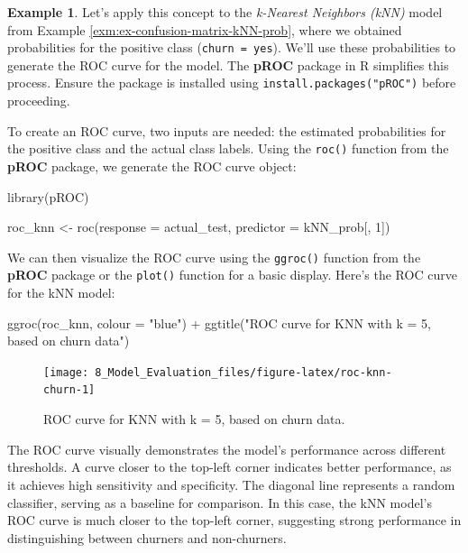 \documentclass[
  11pt,
]{book}
\makeatletter
\newenvironment{Shaded}{}{}
\newcommand{\AttributeTok}[1]{#1}
\newcommand{\DecValTok}[1]{#1}
\newcommand{\FunctionTok}[1]{#1}
\newcommand{\NormalTok}[1]{#1}
\newcommand{\OtherTok}[1]{\textcolor[rgb]{0.39,0.39,0.39}{#1}}
\newcommand{\SpecialCharTok}[1]{\textcolor[rgb]{0.39,0.39,0.39}{#1}}
\newcommand{\StringTok}[1]{\textcolor[rgb]{0.39,0.39,0.39}{#1}}
\newenvironment{kframe}{%
\medskip{}
\setlength{\fboxsep}{.8em}
 \def\at@end@of@kframe{}%
 \ifinner\ifhmode%
  \def\at@end@of@kframe{\end{minipage}}%
  \begin{minipage}{\columnwidth}%
 \fi\fi%
 \def\FrameCommand##1{\hskip\@totalleftmargin \hskip-\fboxsep
 \colorbox{shadecolor}{##1}\hskip-\fboxsep
     \hskip-\linewidth \hskip-\@totalleftmargin \hskip\columnwidth}%
 \MakeFramed {\advance\hsize-\width
   \@totalleftmargin\z@ \linewidth\hsize
   \@setminipage}}%
 {\par\unskip\endMakeFramed%
 \at@end@of@kframe}
\renewenvironment{Shaded}{\begin{kframe}}{\end{kframe}}
\theoremstyle{definition}
\theoremstyle{definition}
\newtheorem{example}{Example}[chapter]
\theoremstyle{definition}
\theoremstyle{definition}
\theoremstyle{remark}
\makeatother
\begin{document}
\begin{example}
\protect\hypertarget{exm:ex-roc-curve-kNN}{}\label{exm:ex-roc-curve-kNN}Let's apply this concept to the \emph{k-Nearest Neighbors (kNN)} model from Example \ref{exm:ex-confusion-matrix-kNN-prob}, where we obtained probabilities for the positive class (\texttt{churn\ =\ yes}). We'll use these probabilities to generate the ROC curve for the model. The \textbf{pROC} package in R simplifies this process. Ensure the package is installed using \texttt{install.packages("pROC")} before proceeding.

To create an ROC curve, two inputs are needed: the estimated probabilities for the positive class and the actual class labels. Using the \texttt{roc()} function from the \textbf{pROC} package, we generate the ROC curve object:

\begin{Shaded}
\begin{Highlighting}[]
\FunctionTok{library}\NormalTok{(pROC)}

\NormalTok{roc\_knn }\OtherTok{\textless{}{-}} \FunctionTok{roc}\NormalTok{(}\AttributeTok{response =}\NormalTok{ actual\_test, }\AttributeTok{predictor =}\NormalTok{ kNN\_prob[, }\DecValTok{1}\NormalTok{])}
\end{Highlighting}
\end{Shaded}

We can then visualize the ROC curve using the \texttt{ggroc()} function from the \textbf{pROC} package or the \texttt{plot()} function for a basic display. Here's the ROC curve for the kNN model:

\begin{Shaded}
\begin{Highlighting}[]
\FunctionTok{ggroc}\NormalTok{(roc\_knn, }\AttributeTok{colour =} \StringTok{"blue"}\NormalTok{) }\SpecialCharTok{+}
    \FunctionTok{ggtitle}\NormalTok{(}\StringTok{"ROC curve for KNN with k = 5, based on churn data"}\NormalTok{)}
\end{Highlighting}
\end{Shaded}

\begin{figure}[H]

{\centering \texttt{[image: 8\_Model\_Evaluation\_files/figure-latex/roc-knn-churn-1]} 

}

\caption{ROC curve for KNN with k = 5, based on churn data.}\label{fig:roc-knn-churn}
\end{figure}

The ROC curve visually demonstrates the model's performance across different thresholds. A curve closer to the top-left corner indicates better performance, as it achieves high sensitivity and specificity. The diagonal line represents a random classifier, serving as a baseline for comparison. In this case, the kNN model's ROC curve is much closer to the top-left corner, suggesting strong performance in distinguishing between churners and non-churners.
\end{example}
\end{document}
